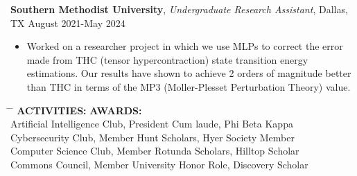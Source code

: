\documentclass[a4paper,10pt]{article}
\begin{document}
\noindent\textbf{Southern Methodist University}, \textit{Undergraduate Research Assistant}, Dallas, TX \hfill August 2021-May 2024
\begin{itemize}[noitemsep,topsep=0pt]
  \item Worked on a researcher project in which we use MLPs to correct the error made from THC (tensor hypercontraction) state transition energy estimations. Our results have shown to achieve 2 orders of magnitude better than THC in terms of the MP3 (Moller-Plesset Perturbation Theory) value.
\end{itemize}


\newpage

\begin{tabbing}
\hspace{4in} \= \hspace{2in} \= \kill
\textbf{ACTIVITIES:} \> \textbf{AWARDS:} \\
Artificial Intelligence Club, President \> Cum laude, Phi Beta Kappa \\
Cybersecurity Club, Member \> Hunt Scholars, Hyer Society Member \\
Computer Science Club, Member \> Rotunda Scholars, Hilltop Scholar  \\
Commons Council, Member \> University Honor Role, Discovery Scholar \\
\end{tabbing}




\vspace{-10pt}
 \vspace{1pt}
\end{document}
